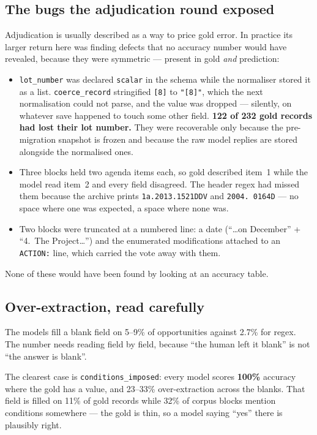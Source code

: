 \documentclass[11pt]{article}
\begin{document}
\subsection{The bugs the adjudication round exposed}

Adjudication is usually described as a way to price gold error. In practice its larger return
here was finding defects that no accuracy number would have revealed, because they were
symmetric --- present in gold \emph{and} prediction:

\begin{itemize}
\item \texttt{lot\_number} was declared \texttt{scalar} in the schema while the normaliser
stored it as a list. \texttt{coerce\_record} stringified \texttt{[8]} to \texttt{"[8]"}, which
the next normalisation could not parse, and the value was dropped --- silently, on whatever
save happened to touch some other field. \textbf{122 of 232 gold records had lost their lot
number.} They were recoverable only because the pre-migration snapshot is frozen and because
the raw model replies are stored alongside the normalised ones.
\item Three blocks held two agenda items each, so gold described item~1 while the model read
item~2 and every field disagreed. The header regex had missed them because the archive prints
\texttt{1a.2013.1521DDV} and \texttt{2004.\ 0164D} --- no space where one was expected,
a space where none was.
\item Two blocks were truncated at a numbered line: a date (``\ldots on December'' +
``4.~The Project\ldots'') and the enumerated modifications attached to an \texttt{ACTION:}
line, which carried the vote away with them.
\end{itemize}

None of these would have been found by looking at an accuracy table.

\subsection{Over-extraction, read carefully}

The models fill a blank field on 5--9\% of opportunities against 2.7\% for regex. The number
needs reading field by field, because ``the human left it blank'' is not ``the answer is
blank''.

The clearest case is \texttt{conditions\_imposed}: every model scores \textbf{100\%} accuracy
where the gold has a value, and 23--33\% over-extraction across the blanks. That field is
filled on 11\% of gold records while 32\% of corpus blocks mention conditions somewhere --- the
gold is thin, so a model saying ``yes'' there is plausibly right.
\end{document}
